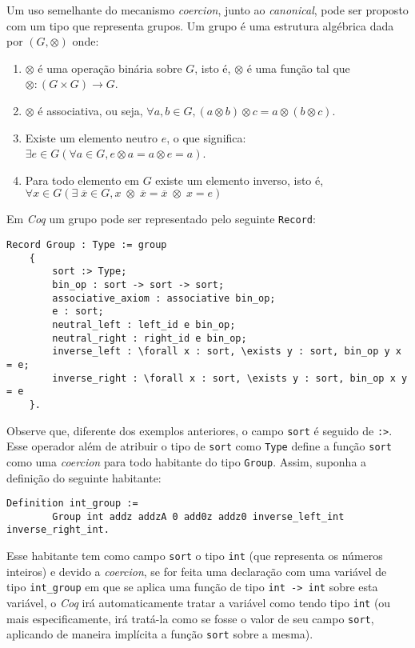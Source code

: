 Um uso semelhante do mecanismo \textit{coercion}, junto ao \textit{canonical}, pode ser proposto com um tipo que representa grupos. Um grupo é uma estrutura algébrica dada por $(G, \otimes)$ onde:
\begin{enumerate}
    \item $\otimes$ é uma operação binária sobre $G$, isto é, $\otimes$ é uma função tal que $\otimes : (G \times G) \rightarrow G$.
    \item $\otimes$ é associativa, ou seja, $\forall a, b \in G, (a \otimes b) \otimes c = a \otimes (b \otimes c)$.
    \item Existe um elemento neutro $e$, o que significa: $\exists e \in G (\forall a \in G, e \otimes a = a \otimes e = a)$. 
    \item Para todo elemento em $G$ existe um elemento inverso, isto é, \\
    $\forall x \in G (\exists \;\overline{x} \in G, x \;\otimes\; \overline{x} = \overline{x} \;\otimes\; x = e)$
\end{enumerate}
Em \textit{Coq} um grupo pode ser representado pelo seguinte \lstinline[language = coq]$Record$:
\begin{lstlisting}[language = coq]
    Record Group : Type := group 
    {
        sort :> Type;
        bin_op : sort -> sort -> sort;
        associative_axiom : associative bin_op;
        e : sort;
        neutral_left : left_id e bin_op;
        neutral_right : right_id e bin_op;
        inverse_left : \forall x : sort, \exists y : sort, bin_op y x = e; 
        inverse_right : \forall x : sort, \exists y : sort, bin_op x y = e 
    }.
\end{lstlisting}
Observe que, diferente dos exemplos anteriores, o campo \lstinline[language = coq]$sort$ é seguido de \lstinline[language = coq]$:>$. Esse operador além de atribuir o tipo de \lstinline[language = coq]$sort$ como \lstinline[language = coq]$Type$
define a função \lstinline[language = coq]$sort$ como uma \textit{coercion} para todo habitante do tipo \lstinline[language = coq]$Group$. Assim, suponha a definição do seguinte habitante:
\begin{lstlisting}[language = coq]
    Definition int_group := 
        Group int addz addzA 0 add0z addz0 inverse_left_int inverse_right_int.
\end{lstlisting}
Esse habitante tem como campo \lstinline[language = coq]$sort$ o tipo \lstinline[language = coq]$int$ (que representa os números inteiros) e devido a \textit{coercion}, se for feita uma declaração com uma variável de tipo \lstinline[language = coq]$int_group$ em que se aplica uma função de tipo \lstinline[language = coq]$int -> int$ sobre esta variável, o \textit{Coq} irá automaticamente tratar a variável como tendo tipo \lstinline[language = coq]$int$ (ou mais especificamente, irá tratá-la como se fosse o valor de seu campo \lstinline[language = coq]$sort$, aplicando de maneira implícita a função \lstinline[language = coq]$sort$ sobre a mesma).

